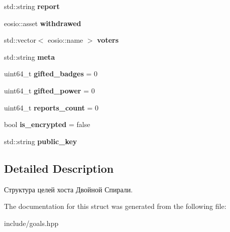 \begin{DoxyCompactItemize}
\item 
\mbox{\label{structgoals_af4397668a230464d201d04d2d681a396}} 
std\+::string {\bfseries report}
\item 
\mbox{\label{structgoals_a7be33b74b9775c4a81eccc70c88287af}} 
eosio\+::asset {\bfseries withdrawed}
\item 
\mbox{\label{structgoals_abb90a7b4a33e2e4f1998ed1b67ecd3c2}} 
std\+::vector$<$ eosio\+::name $>$ {\bfseries voters}
\item 
\mbox{\label{structgoals_a556bed0c2aa8e8199bba15f7e547bb2b}} 
std\+::string {\bfseries meta}
\item 
\mbox{\label{structgoals_a7bce6066ed77bb9d9b2276b7a4a6608f}} 
uint64\+\_\+t {\bfseries gifted\+\_\+badges} = 0
\item 
\mbox{\label{structgoals_a8354980258d5a0080bac28d7823c71c1}} 
uint64\+\_\+t {\bfseries gifted\+\_\+power} = 0
\item 
\mbox{\label{structgoals_a8cbd1349aadc5c372444b234d55bed57}} 
uint64\+\_\+t {\bfseries reports\+\_\+count} = 0
\item 
\mbox{\label{structgoals_a50495b51590f77692594d4e9cffc8ab9}} 
bool {\bfseries is\+\_\+encrypted} = false
\item 
\mbox{\label{structgoals_a3fb010568bcb02eb1f3bee688471fb82}} 
std\+::string {\bfseries public\+\_\+key}
\end{DoxyCompactItemize}


\subsection{Detailed Description}
Структура целей хоста Двойной Спирали. 

The documentation for this struct was generated from the following file\+:\begin{DoxyCompactItemize}
\item 
include/goals.\+hpp\end{DoxyCompactItemize}
